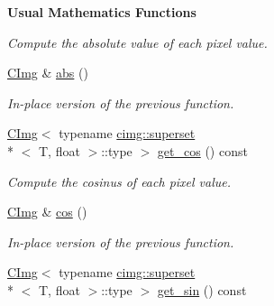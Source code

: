 \begin{Indent}{\bf Usual Mathematics Functions}
\begin{DoxyCompactItemize}
\begin{DoxyCompactList}\small\item\em Compute the absolute value of each pixel value. \end{DoxyCompactList}\item 
\hypertarget{structcimg__library_1_1_c_img_aa16c123928d15dc1c7f48f786cc242b0}{\hyperlink{structcimg__library_1_1_c_img}{C\-Img} \& \hyperlink{structcimg__library_1_1_c_img_aa16c123928d15dc1c7f48f786cc242b0}{abs} ()}\label{structcimg__library_1_1_c_img_aa16c123928d15dc1c7f48f786cc242b0}

\begin{DoxyCompactList}\small\item\em In-\/place version of the previous function. \end{DoxyCompactList}\item 
\hypertarget{structcimg__library_1_1_c_img_a7b6c2dff0d92198f40d20c84217c5770}{\hyperlink{structcimg__library_1_1_c_img}{C\-Img}$<$ typename \hyperlink{structcimg__library_1_1cimg_1_1superset}{cimg\-::superset}\\*
$<$ T, float $>$\-::type $>$ \hyperlink{structcimg__library_1_1_c_img_a7b6c2dff0d92198f40d20c84217c5770}{get\-\_\-cos} () const }\label{structcimg__library_1_1_c_img_a7b6c2dff0d92198f40d20c84217c5770}

\begin{DoxyCompactList}\small\item\em Compute the cosinus of each pixel value. \end{DoxyCompactList}\item 
\hypertarget{structcimg__library_1_1_c_img_a3aba6102a17c99c6ec39258f4e69abf8}{\hyperlink{structcimg__library_1_1_c_img}{C\-Img} \& \hyperlink{structcimg__library_1_1_c_img_a3aba6102a17c99c6ec39258f4e69abf8}{cos} ()}\label{structcimg__library_1_1_c_img_a3aba6102a17c99c6ec39258f4e69abf8}

\begin{DoxyCompactList}\small\item\em In-\/place version of the previous function. \end{DoxyCompactList}\item 
\hypertarget{structcimg__library_1_1_c_img_a6cc35f8ce6860cc807826db4ec4e19d9}{\hyperlink{structcimg__library_1_1_c_img}{C\-Img}$<$ typename \hyperlink{structcimg__library_1_1cimg_1_1superset}{cimg\-::superset}\\*
$<$ T, float $>$\-::type $>$ \hyperlink{structcimg__library_1_1_c_img_a6cc35f8ce6860cc807826db4ec4e19d9}{get\-\_\-sin} () const }\label{structcimg__library_1_1_c_img_a6cc35f8ce6860cc807826db4ec4e19d9}


\end{DoxyCompactItemize}
\end{Indent}
